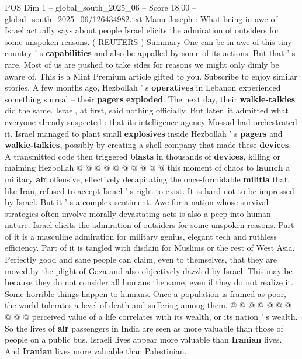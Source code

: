 \begin{textsample}{POS Dim 1 – global\_south\_2025\_06 – Score 18.00 – global\_south\_2025\_06/126434982.txt}  \label{ex:f1_pos_219}
Manu Joseph : What being in awe of Israel actually says about people Israel elicits the admiration of outsiders for some unspoken reasons. ( REUTERS ) Summary One can be in awe of this tiny country ' s \textbf{capabilities} and also be appalled by some of its actions.
But that ' s rare.
Most of us are pushed to take sides for reasons we might only dimly be aware of.
This is a Mint Premium article gifted to you.
Subscribe to enjoy similar stories.
A few months ago, Hezbollah ' s \textbf{operatives} in Lebanon experienced something surreal -- their \textbf{pagers} \textbf{exploded}.
The next day, their \textbf{walkie-talkies} did the same.
Israel, at first, said nothing officially.
But later, it admitted what everyone already suspected : that its intelligence agency Mossad had orchestrated it.
Israel managed to plant small \textbf{explosives} inside Hezbollah ' s \textbf{pagers} and \textbf{walkie-talkies}, possibly by creating a shell company that made these \textbf{devices}.
A transmitted code then triggered \textbf{blasts} in thousands of \textbf{devices}, killing or maiming Hezbollah @ @ @ @ @ @ @ @ @ @ this moment of chaos to \textbf{launch} a military \textbf{air} offensive, effectively decapitating the once-formidable \textbf{militia} that, like Iran, refused to accept Israel ' s right to exist.
It is hard not to be impressed by Israel.
But it ' s a complex sentiment.
Awe for a nation whose survival strategies often involve morally devastating acts is also a peep into human nature.
Israel elicits the admiration of outsiders for some unspoken reasons.
Part of it is a masculine admiration for military genius, elegant tech and ruthless efficiency.
Part of it is tangled with disdain for Muslims or the rest of West Asia.
Perfectly good and sane people can claim, even to themselves, that they are moved by the plight of Gaza and also objectively dazzled by Israel.
This may be because they do not consider all humans the same, even if they do not realize it.
Some horrible things happen to humans.
Once a population is framed as poor, the world tolerates a level of death and suffering among them. @ @ @ @ @ @ @ @ @ @ perceived value of a life correlates with its wealth, or its nation ' s wealth.
So the lives of \textbf{air} passengers in India are seen as more valuable than those of people on a public bus.
Israeli lives appear more valuable than \textbf{Iranian} lives.
And \textbf{Iranian} lives more valuable than Palestinian.

\end{textsample}
